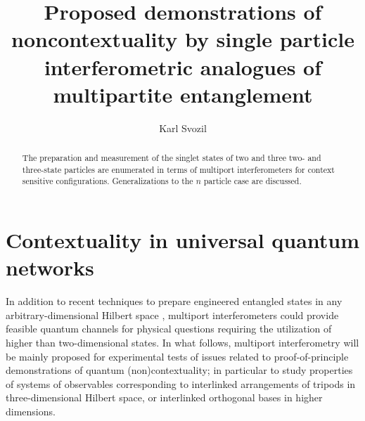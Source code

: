 \documentclass[pra,preprint,showpacs,showkeys,amsfonts]{revtex4}
\begin{document}
\title{Proposed demonstrations of noncontextuality by single particle interferometric analogues of multipartite entanglement}

\author{Karl Svozil}


\begin{abstract}
The preparation and measurement
of the singlet states of two and three two- and three-state particles
are enumerated in terms of multiport interferometers for context sensitive configurations.
Generalizations to the $n$ particle case are discussed.
\end{abstract}



\maketitle

\section{Contextuality in universal quantum networks}

In addition to recent techniques to prepare engineered entangled
states in any arbitrary-dimensional Hilbert space
\cite{mvwz-2001,vwz-2002,gisin-2002-d,tdtm-2003},
multiport interferometers could provide feasible quantum channels for physical questions
requiring the utilization of higher than two-dimensional states.
In what follows, multiport interferometry will be mainly proposed for experimental tests of
issues related to proof-of-principle demonstrations of quantum (non)contextuality;
in particular to study properties of systems of observables
corresponding to interlinked arrangements of tripods in three-dimensional Hilbert space,
or interlinked orthogonal bases in higher dimensions.
\end{document}
